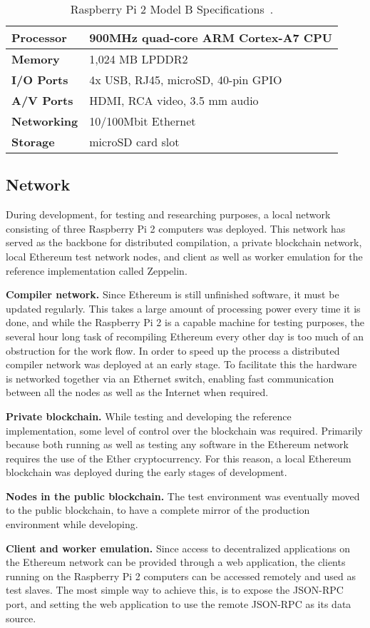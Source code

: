 \begin{table}[h]
\centering
\caption{Raspberry Pi 2 Model B Specifications~\cite{rpi}.}
\label{rpi}
\begin{tabular}{|l|l|}
\hline \textbf{Processor} & 900MHz quad-core ARM Cortex-A7 CPU \\ \hline
\textbf{Memory} & 1,024 MB LPDDR2 \\ \hline 
\textbf{I/O Ports} & 4x USB, RJ45, microSD, 40-pin GPIO \\ \hline
\textbf{A/V Ports} & HDMI, RCA video, 3.5 mm audio \\ \hline
\textbf{Networking} & 10/100Mbit Ethernet \\ \hline
\textbf{Storage} & microSD card slot \\ \hline
\end{tabular}
\end{table}

\subsection{Network}
During development, for testing and researching purposes, a local network consisting of three Raspberry Pi 2 computers was deployed. This network has served as the backbone for distributed compilation, a private blockchain network, local Ethereum test network nodes, and client as well as worker emulation for the reference implementation called Zeppelin.

\textbf{Compiler network.} Since Ethereum is still unfinished software, it must be updated regularly. This takes a large amount of processing power every time it is done, and while the Raspberry Pi 2 is a capable machine for testing purposes, the several hour long task of recompiling Ethereum every other day is too much of an obstruction for the work flow. In order to speed up the process a distributed compiler network was deployed at an early stage. To facilitate this the hardware is networked together via an Ethernet switch, enabling fast communication between all the nodes as well as the Internet when required. 

\textbf{Private blockchain.} While testing and developing the reference implementation, some level of control over the blockchain was required. Primarily because both running as well as testing any software in the Ethereum network requires the use of the Ether cryptocurrency. For this reason, a local Ethereum blockchain was deployed during the early stages of development.

\textbf{Nodes in the public blockchain.} The test environment was eventually moved to the public blockchain, to have a complete mirror of the production environment while developing.

\textbf{Client and worker emulation.} Since access to decentralized applications on the Ethereum network can be provided through a web application, the clients running on the Raspberry Pi 2 computers can be accessed remotely and used as test slaves. The most simple way to achieve this, is to expose the JSON-RPC port, and setting the web application to use the remote JSON-RPC as its data source.
